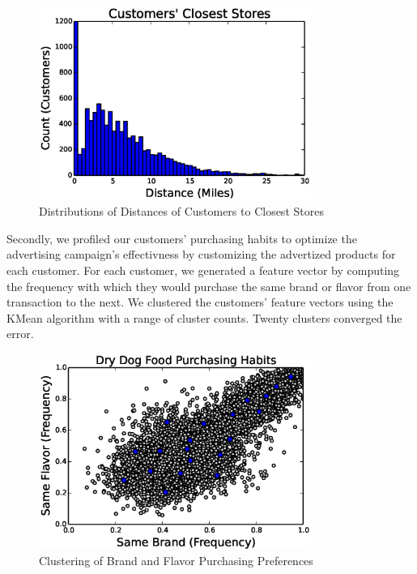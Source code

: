 \documentclass[conference]{IEEEtran}
\begin{document}
\begin{figure}[!t]
  \centering
  \includegraphics[width=3.5in]{figures/customer_store_distances.eps}
  \caption{Distributions of Distances of Customers to Closest Stores}
  \label{fig:cluster_analysis}
\end{figure}

Secondly, we profiled our customers' purchasing habits to optimize the advertising campaign's effectivness by customizing the advertized products for each customer.  For each customer, we generated a feature vector by computing the frequency with which they would purchase the same brand or flavor from one transaction to the next.  We clustered the customers' feature vectors using the KMean algorithm with a range of cluster counts. Twenty clusters converged the error.

\begin{figure}[!t]
  \centering
  \includegraphics[width=3.5in]{figures/cluster_analysis.eps}
  \caption{Clustering of Brand and Flavor Purchasing Preferences}
  \label{fig:cluster_analysis}
\end{figure}
\end{document}
